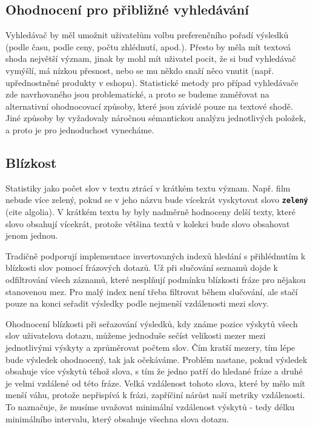 \documentclass[11pt,letterpaper,oneside,openright]{book}
\newcommand{\bftt}[1]{\texttt{\textbf{#1}}}
\begin{document}
\subsection{Ohodnocení pro přibližné vyhledávání}
Vyhledávač by měl umožnit uživatelům volbu preferenčního pořadí výsledků (podle
času, podle ceny, počtu zhlédnutí, apod.). Přesto by měla mít textová shoda
největší význam, jinak by mohl mít uživatel pocit, že si buď vyhledávač
vymýšlí, má nízkou přesnost, nebo se mu někdo snaží něco vnutit (např.
upřednostněné produkty v eshopu). Statistické metody pro případ vyhledávače zde
navrhovaného jsou problematické, a proto se budeme zaměřovat na alternativní
ohodnocovací způsoby, které jsou závislé pouze na textové shodě. Jiné způsoby
by vyžadovaly náročnou sémantickou analýzu jednotlivých položek, a proto je pro
jednoduchost vynecháme.


\subsection{Blízkost}
Statistiky jako počet slov v textu ztrácí v krátkém textu význam. Např. film
nebude více zelený, pokud se v jeho názvu bude vícekrát vyskytovat slovo
\bftt{zelený} (cite algolia). V krátkém textu by byly nadměrně hodnoceny delší
texty, které slovo obsahují vícekrát, protože většina textů v kolekci bude
slovo obsahovat jenom jednou.

Tradičně podporují implementace invertovaných indexů hledání s přihlédnutím k
blízkosti slov pomocí frázových dotazů. Už při slučování seznamů dojde k
odfiltrování všech záznamů, které nesplňují podmínku blízkosti fráze pro
nějakou stanovenou mez. Pro malý index není třeba filtrovat během slučování,
ale stačí pouze na konci seřadit výsledky podle nejmenší vzdálenosti mezi
slovy.

Ohodnocení blízkosti při seřazování výsledků, kdy známe pozice výskytů všech
slov uživatelova dotazu, můžeme jednoduše sečíst velikosti mezer mezi
jednotlivými výskyty a zprůměrovat počtem slov. Čím kratší mezery, tím lépe
bude výsledek ohodnocený, tak jak očekáváme. Problém nastane, pokud výsledek
obsahuje více výskytů téhož slova, s tím že jedno patří do hledané fráze a
druhé je velmi vzdálené od této fráze. Velká vzdálenost tohoto slova, které by
mělo mít menší váhu, protože nepřispívá k frázi, zapříčiní nárůst naší metriky
vzdálenosti. To naznačuje, že musíme uvažovat minimální vzdálenost výskytů -
tedy délku minimálního intervalu, který obsahuje všechna slova dotazu.
\end{document}
